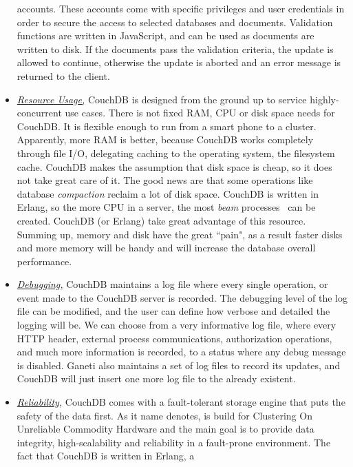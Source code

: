 \begin{itemize}
    accounts. These accounts come with specific privileges and user credentials
    in order to secure the access to selected databases and documents.
    Validation functions are written in JavaScript, and can be used as documents
    are written to disk. If the documents pass the validation criteria, the
    update is allowed to continue, otherwise the update is aborted and an error
    message is returned to the client.
  \item \underline{\emph{Resource Usage,}} CouchDB is designed from the ground
    up to service highly-concurrent use cases. There is not fixed RAM, CPU or
    disk space needs for CouchDB. It is flexible enough to run from a smart
    phone to a cluster. Apparently, more RAM is better, because CouchDB works
    completely through file I/O, delegating caching to the operating system,
    the filesystem cache. CouchDB makes the assumption that disk space is
    cheap, so it does not take great care of it. The good news are that some
    operations like database \emph{compaction} reclaim a lot of disk space.
    CouchDB is  written in Erlang, so the more CPU in a server, the most
    \emph{beam} processes~ can be created. CouchDB (or Erlang)
    take great advantage of this resource. Summing up, memory and disk have the
    great ``pain", as a result faster disks and more memory will be handy and
    will increase the database overall performance.
  \item \underline{\emph{Debugging,}} CouchDB maintains a log file where every
    single operation, or event made to the CouchDB server is
    recorded. The debugging level of the log file can be modified,
    and the user can define how verbose and detailed the logging will be. We can
    choose from a very informative log file, where every HTTP header, external
    process communications, authorization operations, and much more information
    is recorded, to a status where any debug message is disabled. Ganeti also
    maintains a set of log files to record its updates, and CouchDB will just
    insert one more log file to the already existent.
  \item \underline{\emph{Reliability,}} CouchDB comes with a fault-tolerant
    storage engine that puts the safety of the data first. As it name denotes,
    is build for Clustering On Unreliable Commodity Hardware and the main goal
    is to provide data integrity, high-scalability and reliability in a
    fault-prone environment. The fact that CouchDB is written in Erlang, a

\end{itemize}
